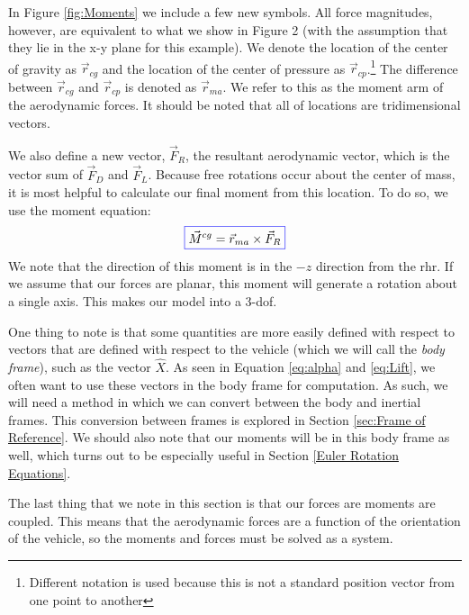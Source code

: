 \documentclass[12pt]{report}
\begin{document}
In Figure \ref{fig:Moments} we include a few new symbols. All force magnitudes, however, are equivalent to what we show in Figure 2 (with the assumption that they lie in the x-y plane for this example). We denote the location of the center of gravity as $\vec{r}_{cg}$ and the location of the center of pressure as $\vec{r}_{cp}$.\footnote{Different notation is used because this is not a standard position vector from one point to another} The difference between $\vec{r}_{cg}$ and $\vec{r}_{cp}$ is denoted as $\vec{r}_{ma}$. We refer to this as the moment arm of the aerodynamic forces. It should be noted that all of locations are tridimensional vectors. 

We also define a new vector, $\vec{F}_R$, the resultant aerodynamic vector, which is the vector sum of $\vec{F}_D$ and $\vec{F}_L$. Because free rotations occur about the center of mass, it is most helpful to calculate our final moment from this location. To do so, we use the moment equation:
\begin{gather}
    \color{blue}\boxed{\color{black}\vec{M}^{cg}=\vec{r}_{ma}\times \vec{F}_R}
\end{gather}
We note that the direction of this moment is in the $-\hat{z}$ direction from the \gls{rhr}. If we assume that our forces are planar, this moment will generate a rotation about a single axis. This makes our model into a 3-\gls{dof}.

One thing to note is that some quantities are more easily defined with respect to vectors that are defined with respect to the vehicle (which we will call the \textit{body frame}), such as the vector $\hat{X}$. As seen in Equation \eqref{eq:alpha} and \eqref{eq:Lift}, we often want to use these vectors in the body frame for computation. As such, we will need a method in which we can convert between the body and inertial frames. This conversion between frames is explored in Section \ref{sec:Frame of Reference}. We should also note that our moments will be in this body frame as well, which turns out to be especially useful in Section \ref{Euler Rotation Equations}.

The last thing that we note in this section is that our forces are moments are coupled. This means that the aerodynamic forces are a function of the orientation of the vehicle, so the moments and forces must be solved as a system.
\end{document}
